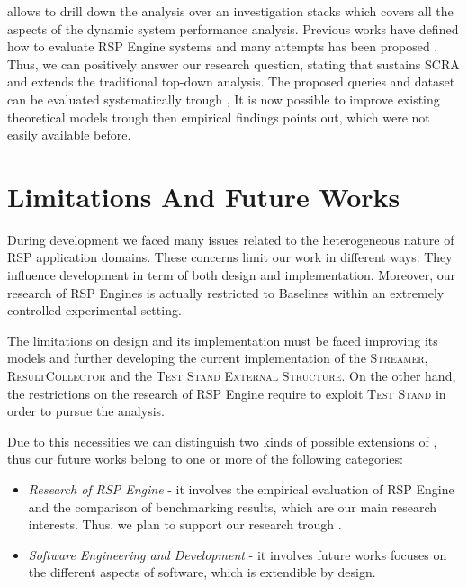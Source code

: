 \noindent \name allows to drill down the analysis over an investigation stacks which covers all the aspects of the dynamic system performance analysis. Previous works have defined how to evaluate RSP Engine systems \cite{DBLP:conf/esws/ScharrenbachUMVB13} and many attempts has been proposed \cite{Zhang2012, LePhuoc2012c, DBLP:conf/semweb/DellAglioCBCV13}. Thus, we can positively answer   our research question, stating that \name sustains SCRA and extends the traditional top-down analysis. The proposed queries and dataset can be evaluated systematically trough \name, It is now possible to improve existing theoretical models trough then empirical findings \name points out, which were not easily available before.


\section{Limitations And Future Works}\label{sec:research-fw-conclusion}

During \name development we faced many issues related to the heterogeneous nature of RSP application domains. These concerns limit our work in different ways. They influence \name development in term of both design and implementation. Moreover, our research of RSP Engines  is actually restricted to \name Baselines within an extremely controlled experimental setting.

The limitations on \name design and its implementation must be faced improving its models and further developing the current implementation of the \textsc{Streamer}, \textsc{ResultCollector} and the \textsc{Test Stand External Structure}. On the other hand, the restrictions on the research of RSP Engine require to exploit \name \textsc{Test Stand} in order to pursue the analysis.

Due to this necessities we can distinguish two kinds of possible extensions of \namens, thus our future works belong to one or more of the following categories:
\begin{itemize}
\item \textit{Research of RSP Engine} - it involves the empirical evaluation of RSP Engine and the comparison of benchmarking results, which are our main research interests. Thus, we plan to support our research trough \namens.
\item \textit{Software Engineering and Development} - it involves future works focuses on the different aspects of \name software, which is extendible by design.
\end{itemize}

